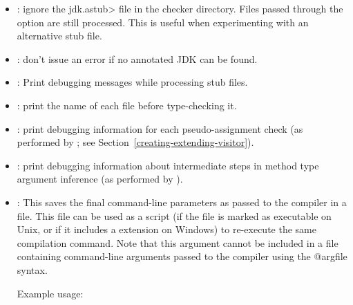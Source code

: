 
\begin{itemize}

\item {}:
  ignore the \<jdk.astub> file in the checker directory. Files passed
  through the  option are still processed. This is useful
  when experimenting with an alternative stub file.

\item {}:
  don't issue an error if no annotated JDK can be found.

\item {}:
  Print debugging messages while processing stub files.

\end{itemize}


\begin{itemize}

\item {}: print the name of each file before type-checking it.

\item {}: print debugging information for each
pseudo-assignment check (as performed by
; see
Section~\ref{creating-extending-visitor}).

\item {}: print debugging information
about intermediate steps in method type argument inference
(as performed by ).

\end{itemize}


\begin{itemize}

\item {}:
  This saves the final command-line parameters as passed to the compiler in a file.
  This file can be used as a script (if the file is marked as executable on Unix, or
  if it includes a  extension on Windows) to re-execute the same compilation command.
  Note that this argument cannot be included in a file containing command-line arguments
  passed to the compiler using the @argfile syntax.

  Example usage: 

\end{itemize}


